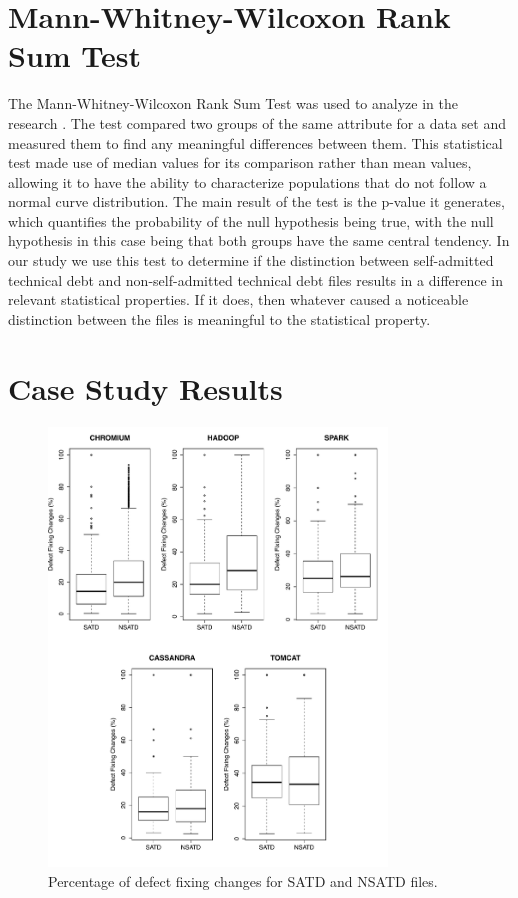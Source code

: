 \section{Mann-Whitney-Wilcoxon Rank Sum Test}
The Mann-Whitney-Wilcoxon Rank Sum Test was used to analyze in the research \cite{mann1947test}. The test compared two groups of the same attribute for a data set and measured them to find any meaningful differences between them. This statistical test made use of median values for its comparison rather than mean values, allowing it to have the ability to characterize populations that do not follow a normal curve distribution. The main result of the test is the p-value it generates, which quantifies the probability of the null hypothesis being true, with the null hypothesis in this case being that both groups have the same central tendency. In our study we use this test to determine if the distinction between self-admitted technical debt and non-self-admitted technical debt files results in a difference in relevant statistical properties. If it does, then whatever caused a noticeable distinction between the files is meaningful to the statistical property. \\




\section{Case Study Results}
\label{chap3:sec:results}

\begin{figure}[tb]
	\centering
	\includegraphics[width=90mm]{figures/chapter3/rq1_correction}
	\caption{Percentage of defect fixing changes for SATD and NSATD files.}
	\label{figure:number_of_fixing_changes_TD_vs_NTD}
\end{figure}

